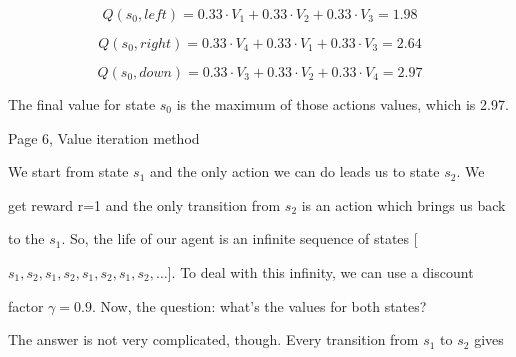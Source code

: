 \begin{equation*}

Q(s_0, left) = 0.33 \cdot V_1 + 0.33 \cdot V_2 + 0.33 \cdot V_3 = 1.98

\end{equation*}

\begin{equation*}

Q(s_0, right) = 0.33 \cdot V_4 + 0.33 \cdot V_1 + 0.33 \cdot V_3 = 2.64

\end{equation*}

\begin{equation*}

Q(s_0, down) = 0.33 \cdot V_3 + 0.33 \cdot V_2 + 0.33 \cdot V_4 = 2.97

\end{equation*}


The final value for state \begin{math}s_0\end{math} is the maximum of those actions values, which is 2.97.


Page 6, Value iteration method


We start from state \begin{math}s_1\end{math} and the only action we can do leads us to state \begin{math}s_2\end{math}. We

get reward r=1 and the only transition from \begin{math}s_2\end{math} is an action which brings us back

to the \begin{math}s_1\end{math}. So, the life of our agent is an infinite sequence of states [

\begin{math}s_1, s_2, s_1, s_2, s_1, s_2, s_1, s_2,\ldots\end{math}]. To deal with this infinity, we can use a discount

factor \begin{math}\gamma=0.9\end{math}. Now, the question: what’s the values for both states?


The answer is not very complicated, though. Every transition from \begin{math}s_1\end{math} to \begin{math}s_2\end{math} gives

